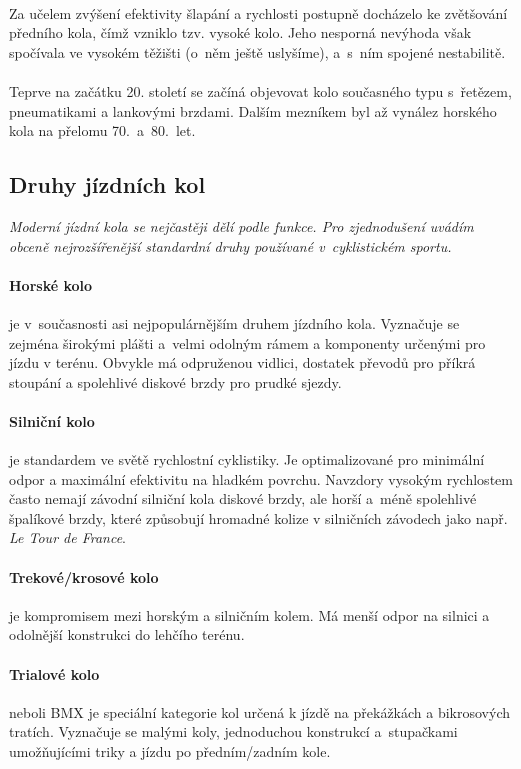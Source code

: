 \documentclass[11pt]{article}
\begin{document}
\paragraph*{} Za učelem zvýšení efektivity šlapání a rychlosti postupně docházelo ke zvětšování předního kola, čímž vzniklo tzv. vysoké kolo. Jeho nesporná nevýhoda však spočívala ve vysokém těžišti (o~něm ještě uslyšíme), a~s~ním spojené nestabilitě. 
\paragraph*{} Teprve na začátku 20. století se začíná objevovat kolo současného typu s~řetězem, pneumatikami a lankovými brzdami. Dalším mezníkem byl až vynález horského kola na přelomu 70.~a~80.~let.
\subsection[Druhy kol]{Druhy jízdních kol}
\textit{Moderní jízdní kola se nejčastěji dělí podle funkce. Pro zjednodušení uvádím obceně nejrozšířenější standardní druhy používané v~cyklistickém sportu.}
\paragraph*{Horské kolo}je v~současnosti asi nejpopulárnějším druhem jízdního kola. Vyznačuje se zejména širokými plášti a~velmi odolným rámem a komponenty určenými pro jízdu v terénu. Obvykle má odpruženou vidlici, dostatek převodů pro příkrá stoupání a spolehlivé diskové brzdy pro prudké sjezdy.
\paragraph*{Silniční kolo}je standardem ve světě rychlostní cyklistiky. Je optimalizované pro minimální odpor a maximální efektivitu na hladkém povrchu. Navzdory vysokým rychlostem často nemají závodní silniční kola diskové brzdy, ale horší a~méně spolehlivé špalíkové brzdy, které způsobují hromadné kolize v silničních závodech jako např. \textit{Le Tour de France}.
\paragraph*{Trekové/krosové kolo}je kompromisem mezi horským a silničním kolem. Má menší odpor na silnici a odolnější konstrukci do lehčího terénu.
\paragraph*{Trialové kolo}neboli BMX je speciální kategorie kol určená k jízdě na překážkách a bikrosových tratích. Vyznačuje se malými koly, jednoduchou konstrukcí a~stupačkami umožňujícími triky a jízdu po předním/zadním kole.
\newpage
\end{document}
